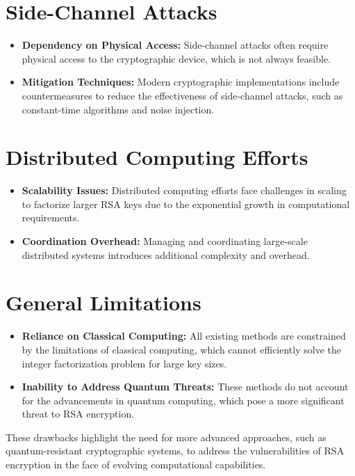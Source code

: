 \documentclass[12pt,a4paper]{report}
\begin{document}
\section{Side-Channel Attacks}
\begin{itemize}
    \item \textbf{Dependency on Physical Access:} Side-channel attacks often require physical access to the cryptographic device, which is not always feasible.
    \item \textbf{Mitigation Techniques:} Modern cryptographic implementations include countermeasures to reduce the effectiveness of side-channel attacks, such as constant-time algorithms and noise injection.
\end{itemize}

\section{Distributed Computing Efforts}
\begin{itemize}
    \item \textbf{Scalability Issues:} Distributed computing efforts face challenges in scaling to factorize larger RSA keys due to the exponential growth in computational requirements.
    \item \textbf{Coordination Overhead:} Managing and coordinating large-scale distributed systems introduces additional complexity and overhead.
\end{itemize}

\section{General Limitations}
\begin{itemize}
    \item \textbf{Reliance on Classical Computing:} All existing methods are constrained by the limitations of classical computing, which cannot efficiently solve the integer factorization problem for large key sizes.
    \item \textbf{Inability to Address Quantum Threats:} These methods do not account for the advancements in quantum computing, which pose a more significant threat to RSA encryption.
\end{itemize}

These drawbacks highlight the need for more advanced approaches, such as quantum-resistant cryptographic systems, to address the vulnerabilities of RSA encryption in the face of evolving computational capabilities.
\end{document}
